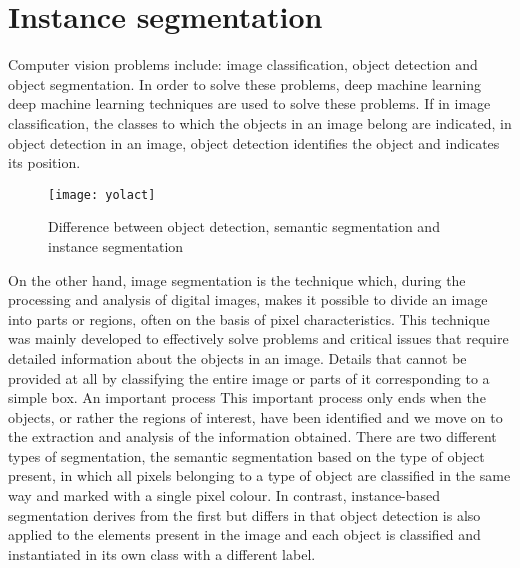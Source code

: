 \section{Instance segmentation}%
Computer vision problems include: image classification, object detection and object segmentation. In order to solve these problems, deep machine learning deep machine
learning techniques are used to solve these problems. If in image classification, the classes to which the objects in an image belong are indicated, in object detection
in an image, object detection identifies the object and indicates its position.

\begin{figure}[h]
    \centering
    \texttt{[image: yolact]} 
    \caption{Difference between object detection, semantic segmentation and instance segmentation}
\end{figure}

On the other hand, image segmentation is the technique which, during the processing and
analysis of digital images, makes it possible to divide an image into parts or regions, often on the basis of pixel characteristics. This technique was mainly developed
to effectively solve problems and critical issues that require detailed information about the objects in an image. Details that cannot be provided at all by classifying
the entire image or parts of it corresponding to a simple box. An important process This important process only ends when the objects, or rather the regions of interest,
have been identified and we move on to the extraction and analysis of the information obtained.
There are two different types of segmentation, the semantic segmentation based on the type of object present, in which all pixels belonging to a type of object are
classified in the same way and marked with a single pixel colour. In contrast, instance-based segmentation derives from the first but differs in that object detection
is also applied to the elements present in the image and each object is classified and instantiated in its own class with a different label.


